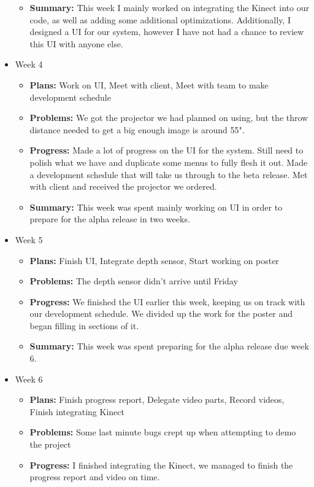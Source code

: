 \documentclass[onecolumn, draftclsnofoot,10pt, compsoc]{IEEEtran}
\begin{document}
\begin{itemize}
\begin{itemize}
    \item \textbf{Summary:} This week I mainly worked on integrating the Kinect into our code, as well as adding some additional optimizations. Additionally, I designed a UI for our system, however I have not had a chance to review this UI with anyone else.
	\end{itemize}
\item Week 4
	\begin{itemize}
	\item \textbf{Plans:} Work on UI, Meet with client, Meet with team to make development schedule
    \item \textbf{Problems:} We got the projector we had planned on using, but the throw distance needed to get a big enough image is around 55".
    \item \textbf{Progress:} Made a lot of progress on the UI for the system. Still need to polish what we have and duplicate some menus to fully flesh it out. Made a development schedule that will take us through to the beta release. Met with client and received the projector we ordered.
    \item \textbf{Summary:} This week was spent mainly working on UI in order to prepare for the alpha release in two weeks.
	\end{itemize}
\item Week 5
	\begin{itemize}
	\item \textbf{Plans:} Finish UI, Integrate depth sensor, Start working on poster
    \item \textbf{Problems:} The depth sensor didn't arrive until Friday
    \item \textbf{Progress:} We finished the UI earlier this week, keeping us on track with our development schedule. We divided up the work for the poster and began filling in sections of it.
    \item \textbf{Summary:} This week was spent preparing for the alpha release due week 6.
	\end{itemize}
\item Week 6
	\begin{itemize}
	\item \textbf{Plans:} Finish progress report, Delegate video parts, Record videos, Finish integrating Kinect
    \item \textbf{Problems:} Some last minute bugs crept up when attempting to demo the project
    \item \textbf{Progress:} I finished integrating the Kinect, we managed to finish the progress report and video on time.

\end{itemize}
\end{itemize}
\end{document}
